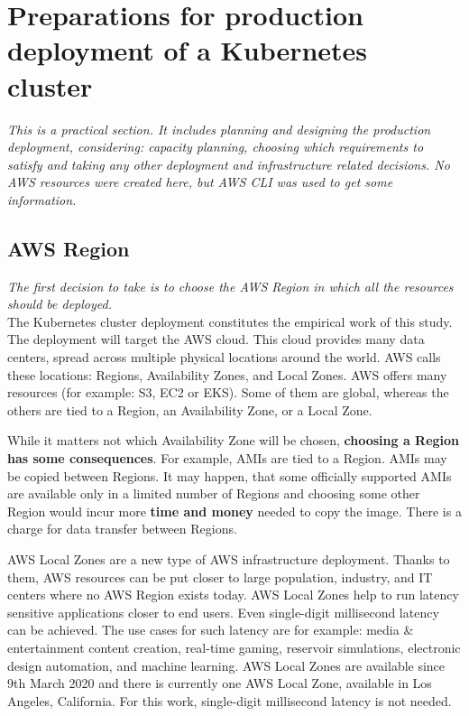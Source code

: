 \section{Preparations for production deployment of a Kubernetes cluster}
\label{prep-prod}
\textit{This is a practical section. It includes planning and designing the production deployment, considering: capacity planning, choosing which requirements to satisfy and taking any other deployment and infrastructure related decisions. No AWS resources were created here, but AWS CLI was used to get some information.}
~\\

\subsection{AWS Region}
\textit{The first decision to take is to choose the AWS Region in which all the resources should be deployed.}
\\

The Kubernetes cluster deployment constitutes the empirical work of this study. The deployment will target the AWS cloud. This cloud provides many data centers, spread across multiple physical locations around the world. AWS calls these locations: Regions, Availability Zones, and Local Zones. AWS offers many resources (for example: S3, EC2 or EKS). Some of them are global, whereas the others are tied to a Region, an Availability Zone, or a Local Zone\cite{az}.

While it matters not which Availability Zone will be chosen, \textbf{choosing a Region has some consequences}. For example, AMIs are tied to a Region. AMIs may be copied between Regions. It may happen, that some officially supported AMIs are available only in a limited number of Regions and choosing some other Region would incur more \textbf{time and money} needed to copy the image. There is a charge for data transfer between Regions\cite{az}.

AWS Local Zones are a new type of AWS infrastructure deployment. Thanks to them, AWS resources can be put closer to large population, industry, and IT centers where no AWS Region exists today. AWS Local Zones help to run latency sensitive applications closer to end users. Even single-digit millisecond latency can be achieved. The use cases for such latency are for example: media & entertainment content creation, real-time gaming, reservoir simulations, electronic design automation, and machine learning\cite{lz}. AWS Local Zones are available since 9th March 2020 and there is currently one AWS Local Zone, available in Los Angeles, California\cite{lz-blog}. For this work, single-digit millisecond latency is not needed.

